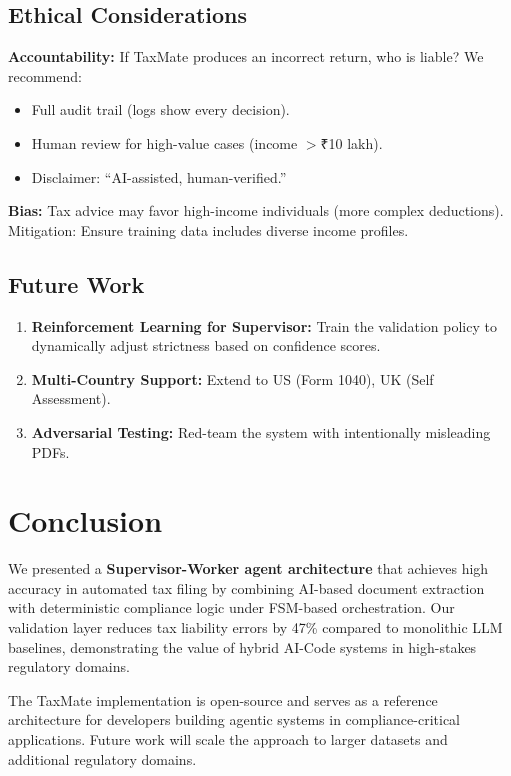 \documentclass[conference]{IEEEtran}
\begin{document}
\subsection{Ethical Considerations}

\textbf{Accountability:} If TaxMate produces an incorrect return, who is liable? We recommend:
\begin{itemize}
    \item Full audit trail (logs show every decision).
    \item Human review for high-value cases (income $>$₹10 lakh).
    \item Disclaimer: ``AI-assisted, human-verified.''
\end{itemize}

\textbf{Bias:} Tax advice may favor high-income individuals (more complex deductions). Mitigation: Ensure training data includes diverse income profiles.

\subsection{Future Work}

\begin{enumerate}
    \item \textbf{Reinforcement Learning for Supervisor:} Train the validation policy to dynamically adjust strictness based on confidence scores.
    \item \textbf{Multi-Country Support:} Extend to US (Form 1040), UK (Self Assessment).
    \item \textbf{Adversarial Testing:} Red-team the system with intentionally misleading PDFs.
\end{enumerate}

\section{Conclusion}
\label{sec:conclusion}

We presented a \textbf{Supervisor-Worker agent architecture} that achieves high accuracy in automated tax filing by combining AI-based document extraction with deterministic compliance logic under FSM-based orchestration. Our validation layer reduces tax liability errors by 47\% compared to monolithic LLM baselines, demonstrating the value of hybrid AI-Code systems in high-stakes regulatory domains.

The TaxMate implementation is open-source and serves as a reference architecture for developers building agentic systems in compliance-critical applications. Future work will scale the approach to larger datasets and additional regulatory domains.
\end{document}
